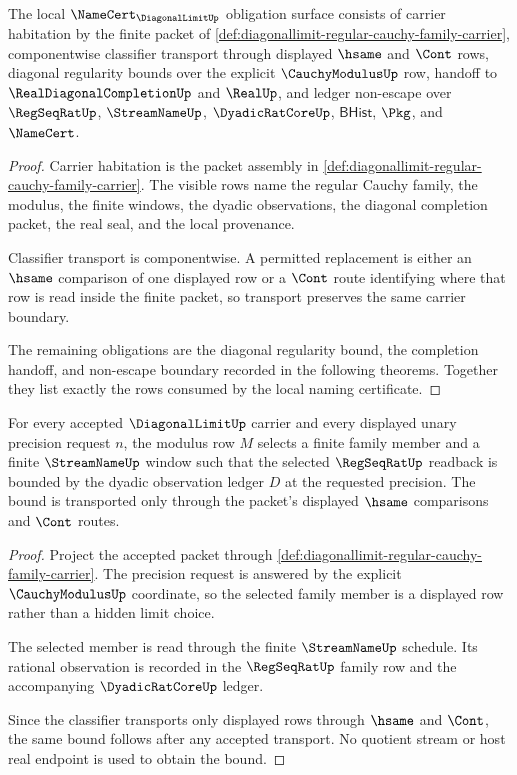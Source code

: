 \begin{theorem}
\label{thm:diagonallimit-namecert-obligation-surface}
The local $\NameCert_{\DiagonalLimitUp}$ obligation surface consists of carrier habitation by the finite packet of \autoref{def:diagonallimit-regular-cauchy-family-carrier}, componentwise classifier transport through displayed $\hsame$ and $\Cont$ rows, diagonal regularity bounds over the explicit $\CauchyModulusUp$ row, handoff to $\RealDiagonalCompletionUp$ and $\RealUp$, and ledger non-escape over $\RegSeqRatUp$, $\StreamNameUp$, $\DyadicRatCoreUp$, $\mathsf{BHist}$, $\Pkg$, and $\NameCert$.
\end{theorem}
\begin{proof}
Carrier habitation is the packet assembly in \autoref{def:diagonallimit-regular-cauchy-family-carrier}. The visible rows name the regular Cauchy family, the modulus, the finite windows, the dyadic observations, the diagonal completion packet, the real seal, and the local provenance.

Classifier transport is componentwise. A permitted replacement is either an $\hsame$ comparison of one displayed row or a $\Cont$ route identifying where that row is read inside the finite packet, so transport preserves the same carrier boundary.

The remaining obligations are the diagonal regularity bound, the completion handoff, and non-escape boundary recorded in the following theorems. Together they list exactly the rows consumed by the local naming certificate.
\end{proof}

\begin{theorem}
\label{thm:diagonallimit-diagonal-regularity-bound}
For every accepted $\DiagonalLimitUp$ carrier and every displayed unary precision request $n$, the modulus row $M$ selects a finite family member and a finite $\StreamNameUp$ window such that the selected $\RegSeqRatUp$ readback is bounded by the dyadic observation ledger $D$ at the requested precision. The bound is transported only through the packet's displayed $\hsame$ comparisons and $\Cont$ routes.
\end{theorem}
\begin{proof}
Project the accepted packet through \autoref{def:diagonallimit-regular-cauchy-family-carrier}. The precision request is answered by the explicit $\CauchyModulusUp$ coordinate, so the selected family member is a displayed row rather than a hidden limit choice.

The selected member is read through the finite $\StreamNameUp$ schedule. Its rational observation is recorded in the $\RegSeqRatUp$ family row and the accompanying $\DyadicRatCoreUp$ ledger.

Since the classifier transports only displayed rows through $\hsame$ and $\Cont$, the same bound follows after any accepted transport. No quotient stream or host real endpoint is used to obtain the bound.
\end{proof}

